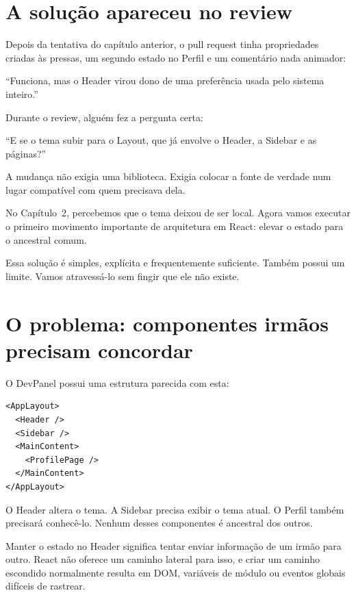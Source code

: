 \label{chap:compartilhar-estado}

\section{A solução apareceu no review}

\begin{historia}
Depois da tentativa do capítulo anterior, o pull request tinha propriedades
criadas às pressas, um segundo estado no Perfil e um comentário nada animador:

``Funciona, mas o Header virou dono de uma preferência usada pelo sistema
inteiro.''

Durante o review, alguém fez a pergunta certa:

``E se o tema subir para o Layout, que já envolve o Header, a Sidebar e as
páginas?''

A mudança não exigia uma biblioteca. Exigia colocar a fonte de verdade num
lugar compatível com quem precisava dela.
\end{historia}

No Capítulo~2, percebemos que o tema deixou de ser local. Agora vamos executar o
primeiro movimento importante de arquitetura em React: elevar o estado para o
ancestral comum.

Essa solução é simples, explícita e frequentemente suficiente. Também possui um
limite. Vamos atravessá-lo sem fingir que ele não existe.

\section{O problema: componentes irmãos precisam concordar}

O DevPanel possui uma estrutura parecida com esta:

\begin{lstlisting}
<AppLayout>
  <Header />
  <Sidebar />
  <MainContent>
    <ProfilePage />
  </MainContent>
</AppLayout>
\end{lstlisting}

O Header altera o tema. A Sidebar precisa exibir o tema atual. O Perfil também
precisará conhecê-lo. Nenhum desses componentes é ancestral dos outros.

Manter o estado no Header significa tentar enviar informação de um irmão para
outro. React não oferece um caminho lateral para isso, e criar um caminho
escondido normalmente resulta em DOM, variáveis de módulo ou eventos globais
difíceis de rastrear.

